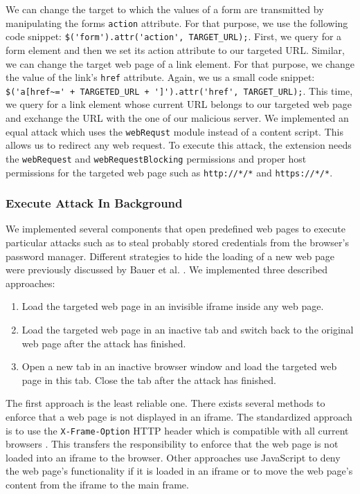 	We can change the target to which the values of a form are transmitted by manipulating the forms \texttt{action} attribute. For that purpose, we use the following code snippet: \lstinline|$('form').attr('action', TARGET_URL);|. First, we query for a form element and then we set its action attribute to our targeted URL. Similar, we can change the target web page of a link element. For that purpose, we change the value of the link's \texttt{href} attribute. Again, we us a small code snippet: \lstinline|$('a[href~=' + TARGETED_URL + ']').attr('href', TARGET_URL);|. This time, we query for a link element whose current URL belongs to our targeted web page and exchange the URL with the one of our malicious server. We implemented an equal attack which uses the \texttt{webRequst} module instead of a content script. This allows us to redirect any web request. To execute this attack, the extension needs the \texttt{webRequest} and \texttt{webRequestBlocking} permissions and proper host permissions for the targeted web page such as \texttt{http://*/*} and \texttt{https://*/*}. 
	
	
\subsubsection{Execute Attack In Background}
\label{sec:executeAttackInBackground}

	We implemented several components that open predefined web pages to execute particular attacks such as to steal probably stored credentials from the browser's password manager. Different strategies to hide the loading of a new web page were previously discussed by Bauer et al. \cite{extensions:cns14}. We implemented three described approaches:
	
	\begin{enumerate}
		\item Load the targeted web page in an invisible iframe inside any web page.
		\item Load the targeted web page in an inactive tab and switch back to the original web page after the attack has finished.
		\item Open a new tab in an inactive browser window and load the targeted web page in this tab. Close the tab after the attack has finished.
	\end{enumerate} 
	
	The first approach is the least reliable one. There exists several methods to enforce that a web page is not displayed in an iframe. The standardized approach is to use the \texttt{X-Frame-Option} HTTP header which is compatible with all current browsers \cite{xFrameOptionsSpezification, xFrameOptionsCompability}. This transfers the responsibility to enforce that the web page is not loaded into an iframe to the browser. Other approaches use JavaScript to deny the web page's functionality if it is loaded in an iframe or to move the web page's content from the iframe to the main frame.
		
